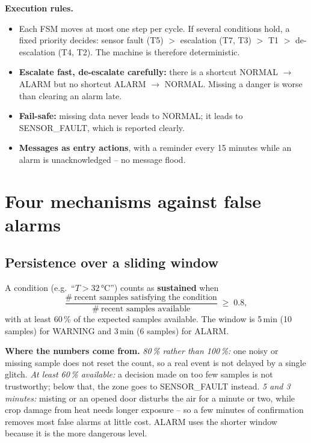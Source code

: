 \documentclass[11pt,a4paper]{report}
\newcommand{\why}[1]{\par\noindent\colorbox{gray!10}{\parbox{\dimexpr\linewidth-2\fboxsep}{\small\textbf{Where the numbers come from.} #1}}\par}
\begin{document}
\textbf{Execution rules.}
\begin{itemize}[noitemsep]
  \item Each FSM moves at most one step per cycle. If several conditions hold, a fixed priority decides: sensor fault (T5) $>$ escalation (T7, T3) $>$ T1 $>$ de-escalation (T4, T2). The machine is therefore deterministic.
  \item \textbf{Escalate fast, de-escalate carefully:} there is a shortcut NORMAL $\to$ ALARM but no shortcut ALARM $\to$ NORMAL. Missing a danger is worse than clearing an alarm late.
  \item \textbf{Fail-safe:} missing data never leads to NORMAL; it leads to SENSOR\_FAULT, which is reported clearly.
  \item \textbf{Messages as entry actions}, with a reminder every 15 minutes while an alarm is unacknowledged -- no message flood.
\end{itemize}

\section{Four mechanisms against false alarms}\label{sec:persist}
\subsection{Persistence over a sliding window}
A condition (e.g.\ ``$T > 32$\,°C'') counts as \textbf{sustained} when
\begin{equation}
  \frac{\#\ \text{recent samples satisfying the condition}}{\#\ \text{recent samples available}} \;\geq\; 0.8,
\end{equation}
with at least 60\,\% of the expected samples available.
The window is 5\,min (10 samples) for WARNING and 3\,min (6 samples) for ALARM.

\why{\emph{80\,\% rather than 100\,\%:} one noisy or missing sample does not reset the count, so a real event is not delayed by a single glitch. \emph{At least 60\,\% available:} a decision made on too few samples is not trustworthy; below that, the zone goes to SENSOR\_FAULT instead. \emph{5 and 3 minutes:} misting or an opened door disturbs the air for a minute or two, while crop damage from heat needs longer exposure -- so a few minutes of confirmation removes most false alarms at little cost. ALARM uses the shorter window because it is the more dangerous level.}
\end{document}
